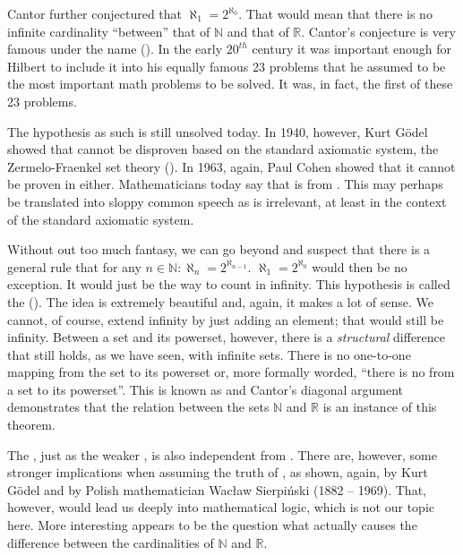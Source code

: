 \documentclass[tikz]{scrreprt}
\begin{document}
Cantor further conjectured that
$\aleph_1 = 2^{\aleph_0}$.
That would mean that there is no infinite cardinality
``between'' that of $\mathbb{N}$ and that of $\mathbb{R}$.
Cantor's conjecture is very famous under the name
 ().
In the early $20^{th}$ century it was important enough
for Hilbert to include it into his equally famous 23 problems
that he assumed to be the most important math problems
to be solved. It was, in fact, the first of these 23 problems.

The hypothesis as such is still unsolved today.
In 1940, however, Kurt Gödel showed
that  cannot be disproven based on the standard
axiomatic system, the Zermelo-Fraenkel set theory ().
In 1963, again, Paul Cohen showed
that it cannot be proven in  either.
Mathematicians today say that  
is  from .
This may perhaps be translated into sloppy common speech as
 is irrelevant, at least in the context
of the standard axiomatic system.

Without out too much fantasy, 
we can go beyond  and suspect 
that there is a general rule that
for any $n \in \mathbb{N}: \aleph_n=2^{\aleph_{n-1}}$.
$\aleph_1=2^{\aleph_0}$ would then be no exception.
It would just be the way to count in infinity.
This hypothesis is called the
 ().
The idea is extremely beautiful and, again,
it makes a lot of sense.
We cannot, of course, extend infinity
by just adding an element; that would still be infinity.
Between a set and its powerset, however, there is
a \emph{structural} difference that still holds,
as we have seen, with infinite sets.
There is no one-to-one mapping 
from the set to its powerset or, more formally worded,
``there is
no  from a set to its powerset''.
This is known as  and
Cantor's diagonal argument demonstrates that 
the relation between the sets
$\mathbb{N}$ and $\mathbb{R}$
is an instance of this theorem.

The , just as the weaker ,
is also independent from .
There are, however, some stronger implications
when assuming the truth of , as shown, again,
by Kurt Gödel and by Polish mathematician
Wac\l{}aw Sierpiński (1882 -- 1969).
That, however, would lead us deeply 
into mathematical logic, which is not our topic here.
More interesting appears to be the question
what actually causes the difference between
the cardinalities of $\mathbb{N}$ and $\mathbb{R}$.
\end{document}
